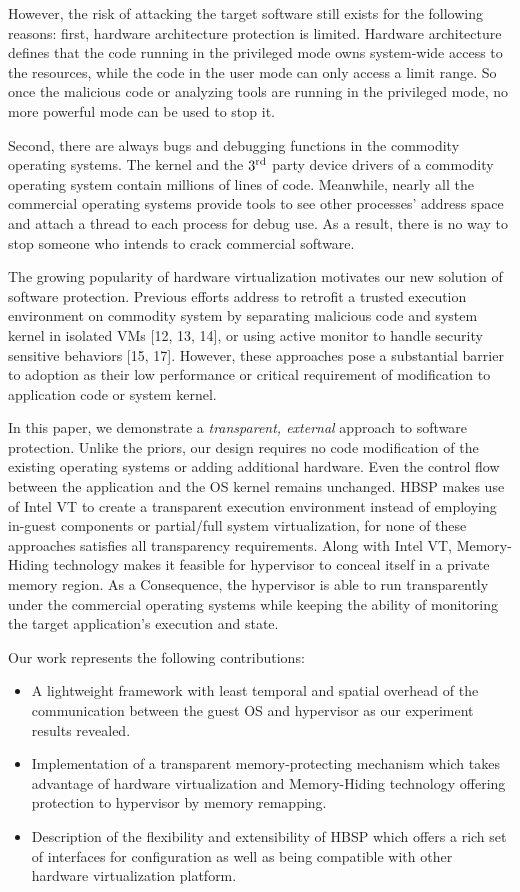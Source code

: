 \documentclass[conference]{IEEEtran}
\begin{document}
However, the risk of attacking the target software still exists
for the following reasons: first, hardware architecture protection
is limited. Hardware architecture defines that the code running in
the privileged mode owns system-wide access to the resources,
while the code in the user mode can only access a limit
range\cite{IEEEhowto:21}. So once the malicious code or analyzing
tools are running in the privileged mode, no more powerful mode
can be used to stop it.

Second, there are always bugs and debugging functions in the
commodity operating systems. The kernel and the $\text3^\text{rd}$
party device drivers of a commodity operating system contain
millions of lines of code\cite{IEEEhowto:7}. Meanwhile, nearly all
the commercial operating systems provide tools to see other
processes' address space and attach a thread to each process for
debug use. As a result, there is no way to stop someone who intends
to crack commercial software.

The growing popularity of hardware virtualization motivates our
new solution of software protection. Previous efforts address to
retrofit a trusted execution environment on commodity system by
separating malicious code and system kernel in isolated VMs [12,
13, 14], or using active monitor to handle security sensitive
behaviors [15, 17]. However, these approaches pose a substantial
barrier to adoption as their low performance or critical
requirement of modification to application code or system kernel.

In this paper, we demonstrate a \emph{transparent, external}
approach to software protection. Unlike the priors, our design
requires no code modification of the existing operating systems or
adding additional hardware. Even the control flow between the
application and the OS kernel remains unchanged. HBSP makes use of
Intel VT to create a transparent execution environment instead of
employing in-guest components or partial/full system
virtualization, for none of these approaches satisfies all
transparency requirements. Along with Intel VT, Memory-Hiding
technology makes it feasible for hypervisor to conceal itself in a
private memory region. As a Consequence, the hypervisor is able to
run transparently under the commercial operating systems while
keeping the ability of monitoring the target application's
execution and state.

Our work represents the following contributions:
\begin{itemize}
\item A lightweight framework with least temporal and spatial
overhead of the communication between the guest OS and hypervisor
as our experiment results revealed. \item Implementation of a
transparent memory-protecting mechanism which takes advantage of
hardware virtualization and Memory-Hiding technology offering
protection to hypervisor by memory remapping. \item Description of
the flexibility and extensibility of HBSP which offers a rich set
of interfaces for configuration as well as being compatible with
other hardware virtualization platform.
\end{itemize}
\end{document}
